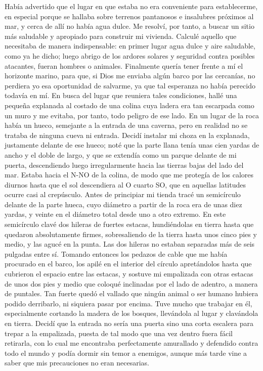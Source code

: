 \documentclass{novela}
\begin{document}
    Había advertido que el lugar en que estaba no era conveniente para establecerme, en especial porque se hallaba sobre terrenos pantanosos e insalubres próximos al mar, y cerca de allí no había agua dulce. Me resolví, por tanto, a buscar un sitio más saludable y apropiado para construir mi vivienda.
    Calculé aquello que necesitaba de manera indispensable: en primer lugar agua dulce y aire saludable, como ya he dicho; luego abrigo de los ardores solares y seguridad contra posibles atacantes, fueran hombres o animales. Finalmente quería tener frente a mí el horizonte marino, para que, si Dios me enviaba algún barco por las cercanías, no perdiera yo esa oportunidad de salvarme, ya que tal esperanza no había perecido todavía en mí.
    En busca del lugar que reuniera tales condiciones, hallé una pequeña explanada al costado de una colina cuya ladera era tan escarpada como un muro y me evitaba, por tanto, todo peligro de ese lado. En un lugar de la roca había un hueco, semejante a la entrada de una caverna, pero en realidad no se trataba de ninguna cueva ni entrada. Decidí instalar mi choza en la explanada, justamente delante de ese hueco; noté que la parte llana tenía unas cien yardas de ancho y el doble de largo, y que se extendía como un parque delante de mi puerta, descendiendo luego irregularmente hacia las tierras bajas del lado del mar. Estaba hacia el N-NO de la colina, de modo que me protegía de los calores diurnos hasta que el sol descendiera al O cuarto SO, que en aquellas latitudes ocurre casi al crepúsculo.
    Antes de principiar mi tienda tracé un semicírculo delante de la parte hueca, cuyo diámetro a partir de la roca era de unas diez yardas, y veinte en el diámetro total desde uno a otro extremo. En este semicírculo clavé dos hileras de fuertes estacas, hundiéndolas en tierra hasta que quedaron absolutamente firmes, sobresaliendo de la tierra hasta unos cinco pies y medio, y las agucé en la punta. Las dos hileras no estaban separadas más de seis pulgadas entre sí. Tomando entonces los pedazos de cable que me había procurado en el barco, los apilé en el interior del círculo apretándolos hasta que cubrieron el espacio entre las estacas, y sostuve mi empalizada con otras estacas de unos dos pies y medio que coloqué inclinadas por el lado de adentro, a manera de puntales. Tan fuerte quedó el vallado que ningún animal o ser humano hubiera podido derribarlo, ni siquiera pasar por encima. Tuve mucho que trabajar en él, especialmente cortando la madera de los bosques, llevándola al lugar y clavándola en tierra.
    Decidí que la entrada no sería una puerta sino una corta escalera para trepar a la empalizada, puesta de tal modo que una vez dentro fuera fácil retirarla, con lo cual me encontraba perfectamente amurallado y defendido contra todo el mundo y podía dormir sin temor a enemigos, aunque más tarde vine a saber que mis precauciones no eran necesarias.
\end{document}
